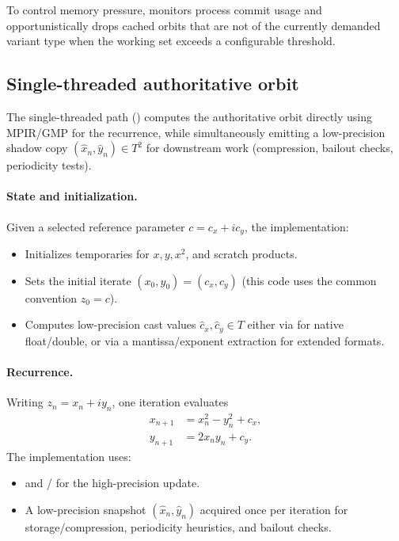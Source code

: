 To control memory pressure,  monitors process commit 
usage and opportunistically drops cached orbits that are not of the currently 
demanded variant type when the working set exceeds a configurable threshold.

\subsection{Single-threaded authoritative orbit}
\label{subsec:ref-orbit-st}

The single-threaded path
()
computes the authoritative orbit directly using MPIR/GMP \cite{MPIR_Library}  for
the recurrence, while simultaneously emitting a low-precision shadow copy
\((\hat{x}_n,\hat{y}_n)\in T^2\) for downstream work (compression, bailout
checks, periodicity tests).

\paragraph{State and initialization.}

Given a selected reference parameter \(c = c_x + i c_y\), the implementation:

\begin{itemize}
  \item Initializes  temporaries for \(x,y,x^2\), and scratch products.
  \item Sets the initial iterate \((x_0,y_0) = (c_x,c_y)\) (this code uses the common convention \(z_0=c\)).
  \item Computes low-precision cast values \(\hat{c}_x,\hat{c}_y \in T\) either via  for
        native float/double, or via a mantissa/exponent extraction for extended formats.
\end{itemize}

\paragraph{Recurrence.}
Writing \(z_n = x_n + i y_n\), one iteration evaluates
\begin{align}
  x_{n+1} &= x_n^2 - y_n^2 + c_x, \\
  y_{n+1} &= 2 x_n y_n + c_y.
\end{align}
The implementation uses:
\begin{itemize}
  \item {} and / for the high-precision update.
  \item A low-precision snapshot \((\hat{x}_n,\hat{y}_n)\) acquired once per iteration for storage/compression,
        periodicity heuristics, and bailout checks.
\end{itemize}

